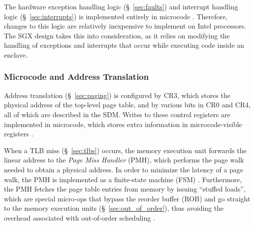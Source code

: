 The hardware exception handling logic (\S~\ref{sec:faults}) and interrupt
handling logic (\S~\ref{sec:interrupts}) is implemented entirely in microcode
\cite{intel1999exceptions}. Therefore, changes to this logic are relatively
inexpensive to implement on Intel processors. The SGX design takes this into
consideration, as it relies on modifying the handling of exceptions and
interrupts that occur while executing code inside an enclave.


\subsubsection{Microcode and Address Translation}


Address translation (\S~\ref{sec:paging}) is configured by CR3, which stores
the physical address of the top-level page table, and by various bits in CR0
and CR4, all of which are described in the SDM. Writes to these control
registers are implemented in microcode, which stores extra information in
microcode-visible registers \cite{intel2009pipeline}.


When a TLB miss (\S~\ref{sec:tlbs}) occurs, the memory execution unit forwards
the linear address to the \textit{Page Miss Handler} (PMH), which performs the
page walk needed to obtain a physical address. In order to minimize the latency
of a page walk, the PMH is implemented as a finite-state machine (FSM)
\cite{hildesheim2014ptm, raikin2014tlb}. Furthermore, the PMH fetches the
page table entries from memory by issuing ``stuffed loads'', which are special
micro-ops that bypass the reorder buffer (ROB) and go straight to the memory
execution units (\S~\ref{sec:out_of_order}), thus avoiding the overhead
associated with out-of-order scheduling
\cite{intel1997pmh, intel1997microspace, hildesheim2014ptm}.

